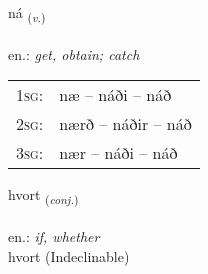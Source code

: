\documentclass[frontgrid, backgrid]{flacards}\usepackage[]{graphicx}\usepackage[]{xcolor}
\begin{document}
\renewcommand{\blhead}{\vskip5pt {\small\bfseries\footnotesize Sagnorð | Verb }}
\renewcommand{\bcfoot}{\vskip5pt \hspace{2pt}{\small\bfseries\footnotesize 1K}}


{ná \small{\textsubscript{(\textit{v.})}} \\[1ex] %
\textphonetic{[nauː]} \\
en.: \emph{get, obtain; catch} \\  [2ex]
\renewcommand*{\arraystretch}{0.8}
\begin{tabular}{p{1cm}l}
\textsc{1sg}: & næ -- náði -- náð \\ 
\textsc{2sg}: & nærð -- náðir -- náð \\ 
\textsc{3sg}: & nær -- náði -- náð \\ 
\end{tabular}
}


\renewcommand{\flhead}{\vskip5pt \fboxsep=0pt {\small\bfseries\footnotesize Samtenging | Conjuction}}
\renewcommand{\fcfoot}{\vskip5pt \fboxsep=0pt \hspace{2pt}{\small\bfseries\footnotesize 1K}}

\renewcommand{\blhead}{\vskip5pt {\small\bfseries\footnotesize Samtenging | Conjuction }}
\renewcommand{\bcfoot}{\vskip5pt \hspace{2pt}{\small\bfseries\footnotesize 1K}}


{hvort \small{\textsubscript{(\textit{conj.})}} \\[1ex]
\textphonetic{[kʰvɔr̥t]} \\
en.: \emph{if, whether} \\  [2ex]
hvort (Indeclinable)}

\renewcommand{\flhead}{\vskip5pt \fboxsep=0pt {\small\bfseries\footnotesize Lýsingarorð | Adjective}}
\renewcommand{\fcfoot}{\vskip5pt \fboxsep=0pt \hspace{2pt}{\small\bfseries\footnotesize 1K}}

\renewcommand{\blhead}{\vskip5pt {\small\bfseries\footnotesize Lýsingarorð | Adjective }}
\renewcommand{\bcfoot}{\vskip5pt \hspace{2pt}{\small\bfseries\footnotesize 1K}}
\end{document}
